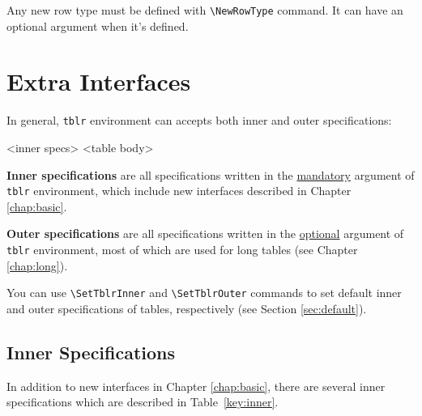 \documentclass[oneside]{book}
\begin{document}
Any new row type must be defined with \verb!\NewRowType! command.
It can have an optional argument when it's defined.

\chapter{Extra Interfaces}
\label{chap:extra}

In general, \verb!tblr! environment can accepts both inner and outer specifications:

\begin{codehigh}
\begin{tblr}{<inner specs>}
  <table body>
\end{tblr}
\end{codehigh}

\textbf{Inner specifications} are all specifications written in the \underline{mandatory} argument
of \verb!tblr! environment, which include new interfaces described in Chapter \ref{chap:basic}.

\textbf{Outer specifications} are all specifications written in the \underline{optional} argument
of \verb!tblr! environment, most of which are used for long tables (see Chapter \ref{chap:long}).

You can use \verb!\SetTblrInner! and \verb!\SetTblrOuter! commands
to set default inner and outer specifications of tables, respectively (see Section \ref{sec:default}).

\section{Inner Specifications}

In addition to new interfaces in Chapter \ref{chap:basic},
there are several inner specifications which are described in Table~\ref{key:inner}.
\end{document}
